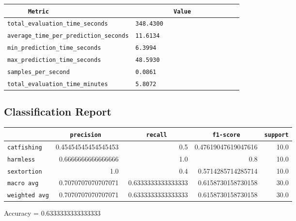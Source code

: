 \documentclass{article}
\begin{document}
\begin{center}
\begin{tabular}{l | l} \hline
    \verb|      Metric     | & \verb|           Value           | \\ \hline
    \hline
    \verb|total_evaluation_time_seconds| & \verb|348.4300                     | \\ \hline
    \verb|average_time_per_prediction_seconds| & \verb|11.6134                      | \\ \hline
    \verb|min_prediction_time_seconds| & \verb|6.3994                       | \\ \hline
    \verb|max_prediction_time_seconds| & \verb|48.5930                      | \\ \hline
    \verb|samples_per_second| & \verb|0.0861                       | \\ \hline
    \verb|total_evaluation_time_minutes| & \verb|5.8072                       | \\ \hline
\end{tabular}
\end{center}

\subsection{Classification Report}

\begin{center}
\begin{tabular}{l | r | r | r | r} \hline
    \verb|            | & \verb|    precision     | & \verb|      recall      | & \verb|     f1-score     | & \verb|support| \\ \hline
    \hline
    \verb|catfishing | & 0.45454545454545453 & 0.5 & 0.47619047619047616 &    10.0 \\ \hline
    \verb|harmless   | & 0.6666666666666666 & 1.0 & 0.8 &    10.0 \\ \hline
    \verb|sextortion | & 1.0 & 0.4 & 0.5714285714285714 &    10.0 \\ \hline
    \verb|macro avg  | & 0.7070707070707071 & 0.6333333333333333 & 0.6158730158730158 &    30.0 \\ \hline
    \verb|weighted avg| & 0.7070707070707071 & 0.6333333333333333 & 0.6158730158730158 &    30.0 \\ \hline
\end{tabular}
\end{center}

\begin{center}
Accuracy = 0.6333333333333333
\end{center}
\end{document}
